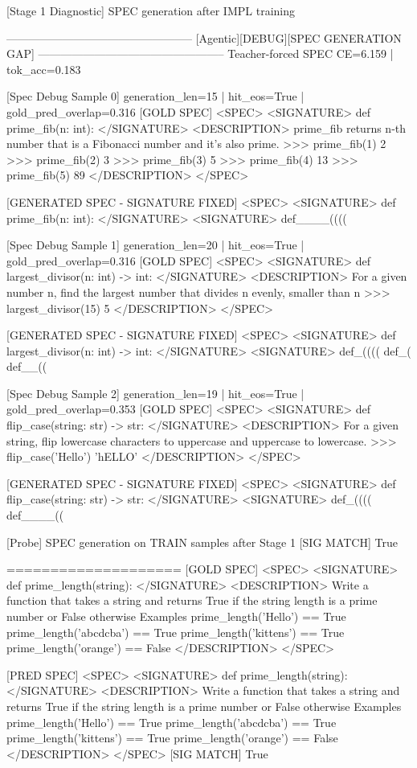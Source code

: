 [Stage 1 Diagnostic] SPEC generation after IMPL training

--------------------------------------------------
[Agentic][DEBUG][SPEC GENERATION GAP]
--------------------------------------------------
Teacher-forced SPEC CE=6.159 | tok_acc=0.183

[Spec Debug Sample 0]
generation_len=15 | hit_eos=True | gold_pred_overlap=0.316
[GOLD SPEC]
<SPEC> <SIGNATURE> def prime_fib(n: int): </SIGNATURE> <DESCRIPTION> prime_fib returns n-th number that is a Fibonacci number and it's also prime. >>> prime_fib(1) 2 >>> prime_fib(2) 3 >>> prime_fib(3) 5 >>> prime_fib(4) 13 >>> prime_fib(5) 89 </DESCRIPTION> </SPEC>

[GENERATED SPEC - SIGNATURE FIXED]
<SPEC>
<SIGNATURE>
def prime_fib(n: int):
</SIGNATURE>
<SIGNATURE> def____((((

[Spec Debug Sample 1]
generation_len=20 | hit_eos=True | gold_pred_overlap=0.316
[GOLD SPEC]
<SPEC> <SIGNATURE> def largest_divisor(n: int) -> int: </SIGNATURE> <DESCRIPTION> For a given number n, find the largest number that divides n evenly, smaller than n >>> largest_divisor(15) 5 </DESCRIPTION> </SPEC>

[GENERATED SPEC - SIGNATURE FIXED]
<SPEC>
<SIGNATURE>
def largest_divisor(n: int) -> int:
</SIGNATURE>
<SIGNATURE> def_(((( def_( def__((

[Spec Debug Sample 2]
generation_len=19 | hit_eos=True | gold_pred_overlap=0.353
[GOLD SPEC]
<SPEC> <SIGNATURE> def flip_case(string: str) -> str: </SIGNATURE> <DESCRIPTION> For a given string, flip lowercase characters to uppercase and uppercase to lowercase. >>> flip_case('Hello') 'hELLO' </DESCRIPTION> </SPEC>

[GENERATED SPEC - SIGNATURE FIXED]
<SPEC>
<SIGNATURE>
def flip_case(string: str) -> str:
</SIGNATURE>
<SIGNATURE> def_(((( def____((

[Probe] SPEC generation on TRAIN samples after Stage 1
[SIG MATCH] True

====================
[GOLD SPEC]
<SPEC> <SIGNATURE> def prime_length(string): </SIGNATURE> <DESCRIPTION> Write a function that takes a string and returns True if the string length is a prime number or False otherwise Examples prime_length('Hello') == True prime_length('abcdcba') == True prime_length('kittens') == True prime_length('orange') == False </DESCRIPTION> </SPEC>

[PRED SPEC]
<SPEC> <SIGNATURE> def prime_length(string): </SIGNATURE> <DESCRIPTION> Write a function that takes a string and returns True if the string length is a prime number or False otherwise Examples prime_length('Hello') == True prime_length('abcdcba') == True prime_length('kittens') == True prime_length('orange') == False </DESCRIPTION> </SPEC>
[SIG MATCH] True

